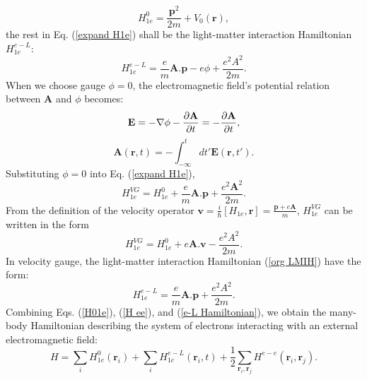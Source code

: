 \documentclass[12pt,english,a4paper]{article}
\begin{document}
	\begin{equation}
		\label{H01e}
		H^0_{1e} = \frac{\textbf{p}^2}{2m} +V_0 (\textbf{r}),
	\end{equation}
	the rest in Eq. (\ref{expand H1e}) shall be the light-matter interaction Hamiltonian $H^{e-L}_{1e}$:
	\begin{equation}
		\label{org LMIH}
		H^{e-L}_{1e} =\frac{e}{m} \textbf{A}.\textbf{p} - e\phi + \frac{e^2 A^2}{2m}.
	\end{equation}
	\quad When we choose gauge $\phi = 0$, the electromagnetic field's potential relation between $\textbf{A}$ and $\phi$ becomes:
	\begin{equation}
		\textbf{E} = - \nabla \phi - \pdv{\textbf{A}}{t} = - \pdv{\textbf{A}}{t},
	\end{equation}
	\begin{equation}
		\textbf{A}(\textbf{r},t) = -\int_{-\infty}^t dt' \textbf{E}(\textbf{r}, t'). 
	\end{equation}
\quad Substituting $\phi = 0$ into Eq. (\ref{expand H1e}),
	\begin{equation}
		H^{VG}_{1e}= H^0_{1e} + \frac{e}{m}\textbf{A}.\textbf{p} + \frac{e^2\textbf{A}^2}{2m}.
	\end{equation}
	\quad From the definition of the velocity operator $\textbf{v}= \frac{i}{\hbar} [H_{1e}, \textbf{r}] = \frac{\textbf{p}+e\textbf{A}}{m}$, $H^{VG}_{1e}$ can be written in the form
	\begin{equation}
		\label{H VG}
		H^{VG}_{1e} = H^0_{1e} + e \textbf{A}.\textbf{v} - \frac{e^2A^2}{2m}.
	\end{equation}
	\quad In velocity gauge, the light-matter interaction Hamiltonian (\ref{org LMIH}) have the form:
	\begin{equation}
		\label{e-L Hamiltonian}
		H^{e-L}_{1e} =\frac{e}{m} \textbf{A}.\textbf{p} + \frac{e^2 A^2}{2m}.
	\end{equation}
	Combining Eqs. (\ref{H01e}), (\ref{H ee}), and (\ref{e-L Hamiltonian}), we obtain the many-body Hamiltonian describing the system of electrons interacting with an external electromagnetic field:
	\begin{equation}
		\label{1st Quanti}
		H =  \sum_{i} H^0_{1e} (\textbf{r}_i) + \sum_{i} H^{e-L}_{1e} (\textbf{r}_i,t) + \frac{1}{2} \sum_{\textbf{r}_i, \textbf{r}_j}H^{e-e}(\textbf{r}_i, \textbf{r}_j).
	\end{equation}
\end{document}

